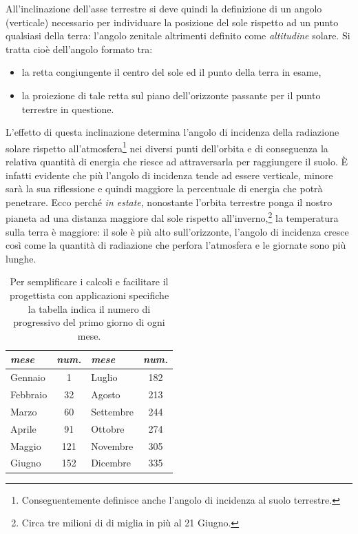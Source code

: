 All'inclinazione dell'asse terrestre si deve quindi la definizione di un angolo (verticale) necessario per individuare la posizione del sole rispetto ad un punto qualsiasi della terra: l'angolo zenitale altrimenti definito come \emph{altitudine} solare. Si tratta cioè dell'angolo formato tra:

\begin{itemize}
\item  la retta congiungente il centro del sole ed il punto della terra in esame,
\item la proiezione di tale retta sul piano dell'orizzonte passante per il punto terrestre in questione.
\end{itemize}
 
L'effetto di questa inclinazione determina l'angolo di incidenza della radiazione solare rispetto all'atmosfera\footnote{Conseguentemente definisce anche l'angolo di incidenza al suolo terrestre.} nei diversi punti dell'orbita e di conseguenza la relativa quantità di energia che riesce ad attraversarla per raggiungere il suolo. È infatti evidente che più l'angolo di incidenza tende ad essere verticale, minore sarà la sua riflessione e quindi maggiore la percentuale di energia che potrà penetrare. Ecco perché \emph{in estate}, nonostante l'orbita terrestre ponga il nostro pianeta ad una distanza maggiore dal sole rispetto all'inverno,\footnote{Circa tre milioni di di miglia in più al 21 Giugno.} la temperatura sulla terra è maggiore: il sole è più alto sull'orizzonte, l'angolo di incidenza cresce così come la quantità di radiazione che perfora l'atmosfera e le giornate sono più lunghe.

\begin{table}[htp]
\centering
\caption{Per semplificare i calcoli e facilitare il progettista con applicazioni specifiche la tabella indica il numero di progressivo del primo giorno di ogni mese.}
\label{tab:num-primo-giorno-mese}
\begin{tabular}{@{}lclc@{}}
\toprule
\textit{mese} & \textit{num.} & \textit{mese} & \textit{num.} \\ \toprule
Gennaio       & 1             & Luglio        & 182           \\ %
Febbraio      & 32            & Agosto        & 213           \\ %
Marzo         & 60            & Settembre     & 244           \\ %
Aprile        & 91            & Ottobre       & 274           \\ %
Maggio       & 121           & Novembre      & 305           \\ %
Giugno        & 152           & Dicembre      & 335           \\ \bottomrule
\end{tabular}
\end{table}






